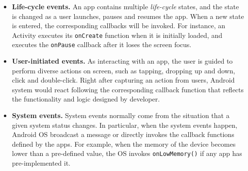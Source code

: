 \begin{itemize}
    \item \textbf{Life-cycle events.} An app contains multiple \emph{life-cycle} states, and the state is changed as a user launches, pauses and resumes the app. 
When a new state is entered, the corresponding callbacks will be invoked. 
For instance, an Activity executes its \texttt{onCreate} function when it is initially loaded, and executes the \texttt{onPause} callback after it loses the screen focus. 



    \item \textbf{User-initiated events. }
        As interacting with an app, the user is guided to perform diverse actions on screen, 
        such as tapping, dropping up and down, click and double-click. 
        Right after capturing an action from users, Android system would react following the corresponding callback function that reflects the functionality and logic designed by developer. 
    \item \textbf{System events.} System events normally come from the situation that a given system status changes. 
        In particular, when the system events happen, Android OS broadcast a message or directly invokes the callback functions defined by the apps. 
For example, when the memory of the device becomes lower than a pre-defined value, 
the OS invokes \texttt{onLowMemory()} if any app has pre-implemented it. 


\end{itemize}
